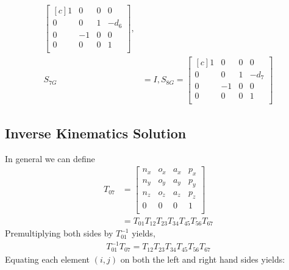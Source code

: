 \documentclass{article}
\begin{document}
\begin{align*}
\begin{bmatrix*}[c]
1 & 0 & 0 & 0 \\
0 & 0 & 1 & -d_6 \\
0 & -1 & 0 & 0 \\
0 & 0 & 0 & 1 \\
\end{bmatrix*}, \\
S_{7G} &= I,
S_{8G} =
\begin{bmatrix*}[c]
1 & 0 & 0 & 0 \\
0 & 0 & 1 & -d_7 \\
0 & -1 & 0 & 0 \\
0 & 0 & 0 & 1 \\
\end{bmatrix*}
\end{align*}

\subsection{Inverse Kinematics Solution}
In general we can define
\begin{align*}
T_{07} &=
\left[\begin{matrix}
n_x & o_x & a_x & p_x \\
n_y & o_y & a_y & p_y \\
n_z & o_z & a_z & p_z \\
  0 &   0 &   0 &   1 \\
\end{matrix}\right]\\
&= T_{01} T_{12} T_{23} T_{34} T_{45} T_{56} T_{67}
\end{align*}
Premultiplying both sides by $T_{01}^{-1}$ yields,
\begin{align*}
T_{01}^{-1} T_{07} = T_{12} T_{23} T_{34} T_{45} T_{56} T_{67}
\end{align*}
Equating each element $(i,j)$ on both the left and right hand sides yields:
\end{document}
